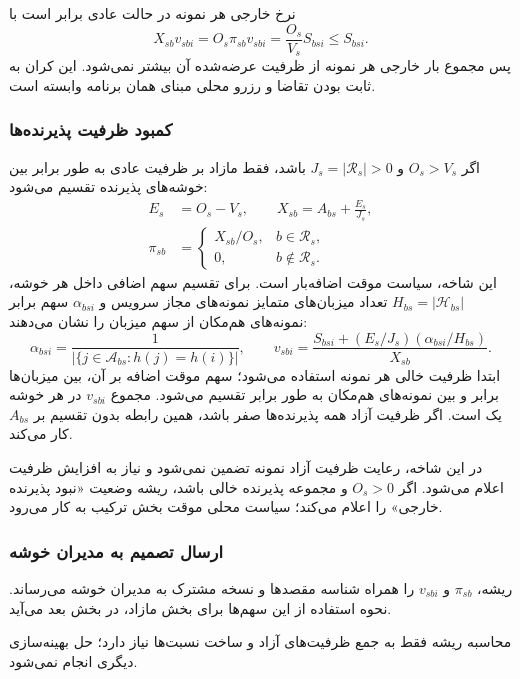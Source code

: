 نرخ خارجی هر نمونه در حالت عادی برابر است با
\begin{equation}
 X_{sb}v_{sbi}=O_s\pi_{sb}v_{sbi}
              =\frac{O_s}{V_s}S_{bsi}\leq S_{bsi}.
 \label{eq:root-instance-bound}
\end{equation}
پس مجموع بار خارجی هر نمونه از ظرفیت عرضه‌شده آن بیشتر نمی‌شود. این کران به ثابت بودن تقاضا و رزرو محلی مبنای همان برنامه وابسته است.

\subsubsection{کمبود ظرفیت پذیرنده‌ها}

اگر $O_s>V_s$ و $J_s=|\mathcal R_s|>0$ باشد، فقط مازاد بر ظرفیت عادی به طور برابر بین خوشه‌های پذیرنده تقسیم می‌شود:
\begin{align}
 E_s&=O_s-V_s,\qquad
 X_{sb}=A_{bs}+\frac{E_s}{J_s},\\
 \pi_{sb}&=\begin{cases}
 X_{sb}/O_s,&b\in\mathcal R_s,\\
 0,&b\notin\mathcal R_s.
 \end{cases}
 \label{eq:root-temporary-weights}
\end{align}
این شاخه، سیاست موقت اضافه‌بار است. برای تقسیم سهم اضافی داخل هر خوشه، $H_{bs}=|\mathcal H_{bs}|$ تعداد میزبان‌های متمایز نمونه‌های مجاز سرویس و $\alpha_{bsi}$ سهم برابر نمونه‌های هم‌مکان از سهم میزبان را نشان می‌دهند:
\begin{equation}
 \alpha_{bsi}=\frac{1}{|\{j\in\mathcal A_{bs}:h(j)=h(i)\}|},\qquad
 v_{sbi}=\frac{S_{bsi}+(E_s/J_s)(\alpha_{bsi}/H_{bs})}{X_{sb}}.
 \label{eq:root-temporary-instance}
\end{equation}
ابتدا ظرفیت خالی هر نمونه استفاده می‌شود؛ سهم موقت اضافه بر آن، بین میزبان‌ها برابر و بین نمونه‌های هم‌مکان به طور برابر تقسیم می‌شود. مجموع $v_{sbi}$ در هر خوشه یک است. اگر ظرفیت آزاد همه پذیرنده‌ها صفر باشد، همین رابطه بدون تقسیم بر $A_{bs}$ کار می‌کند.

در این شاخه، رعایت ظرفیت آزاد نمونه تضمین نمی‌شود و نیاز به افزایش ظرفیت اعلام می‌شود. اگر $O_s>0$ و مجموعه پذیرنده خالی باشد، ریشه وضعیت «نبود پذیرنده خارجی» را اعلام می‌کند؛ سیاست محلی موقت بخش ترکیب به کار می‌رود.

\subsubsection{ارسال تصمیم به مدیران خوشه}

ریشه، $\pi_{sb}$ و $v_{sbi}$ را همراه شناسه مقصدها و نسخه مشترک به مدیران خوشه می‌رساند. نحوه استفاده از این سهم‌ها برای بخش مازاد، در بخش بعد می‌آید.

محاسبه ریشه فقط به جمع ظرفیت‌های آزاد و ساخت نسبت‌ها نیاز دارد؛ حل بهینه‌سازی دیگری انجام نمی‌شود.
